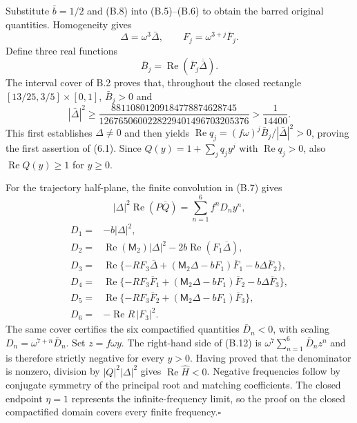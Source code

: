\documentclass[11pt,a4paper]{article}
\newcommand{\proofend}{\hfill\(\square\)\par\addvspace{0.6\baselineskip}}
\begin{document}
Substitute \(\bar b=1/2\) and (B.8) into (B.5)–(B.6) to obtain the barred original quantities. Homogeneity gives
\begin{equation*}\tag{B.9}
\Delta=\omega^3\bar\Delta,\qquad F_j=\omega^{3+j}\bar F_j.
\end{equation*}
Define three real functions
\begin{equation*}\tag{B.10}
\bar B_j=\operatorname{Re}(\bar F_j\overline{\bar\Delta}).
\end{equation*}
The interval cover of B.2 proves that, throughout the closed rectangle \([13/25,3/5]\times[0,1]\), \(\bar B_j>0\) and
\begin{equation*}\tag{B.11}
|\bar\Delta|^2\ge
\frac{88110801209184778874628745}{1267650600228229401496703205376}
>\frac1{14400}.
\end{equation*}
This first establishes \(\Delta\ne0\) and then yields
\(\operatorname{Re}q_j=(f\omega)^j\bar B_j/|\bar\Delta|^2>0\), proving the first assertion of (6.1). Since \(Q(y)=1+\sum_jq_jy^j\) with \(\operatorname{Re}q_j>0\), also \(\operatorname{Re}Q(y)\ge1\) for \(y\ge0\).

For the trajectory half-plane, the finite convolution in (B.7) gives
\begin{equation*}\tag{B.12}
|\Delta|^2\operatorname{Re}(P\overline Q)
=\sum_{n=1}^6 f^nD_ny^n,
\end{equation*}
\begin{equation*}\tag{B.13}
\begin{aligned}
D_1={}&-b|\Delta|^2,\\
D_2={}&\operatorname{Re}(\mathsf M_2)|\Delta|^2-2b\operatorname{Re}(F_1\overline\Delta),\\
D_3={}&\operatorname{Re}\{-RF_3\overline\Delta+
(\mathsf M_2\Delta-bF_1)\overline F_1-b\Delta\overline F_2\},\\
D_4={}&\operatorname{Re}\{-RF_3\overline F_1+
(\mathsf M_2\Delta-bF_1)\overline F_2-b\Delta\overline F_3\},\\
D_5={}&\operatorname{Re}\{-RF_3\overline F_2+
(\mathsf M_2\Delta-bF_1)\overline F_3\},\\
D_6={}&-\operatorname{Re}R\,|F_3|^2.
\end{aligned}
\end{equation*}
The same cover certifies the six compactified quantities \(\bar D_n<0\), with scaling \(D_n=\omega^{7+n}\bar D_n\). Set \(z=f\omega y\). The right-hand side of (B.12) is
\(\omega^7\sum_{n=1}^6\bar D_nz^n\) and is therefore strictly negative for every \(y>0\). Having proved that the denominator is nonzero, division by \(|Q|^2|\Delta|^2\) gives \(\operatorname{Re}\widehat H<0\). Negative frequencies follow by conjugate symmetry of the principal root and matching coefficients. The closed endpoint \(\eta=1\) represents the infinite-frequency limit, so the proof on the closed compactified domain covers every finite frequency.\proofend
\end{document}
